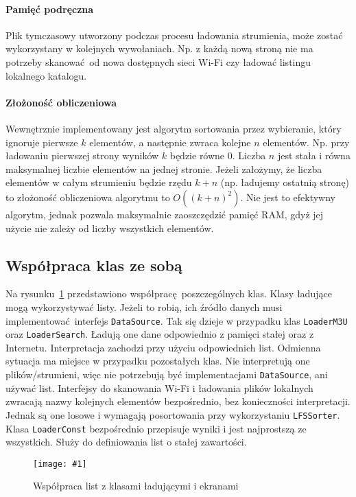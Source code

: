 \documentclass[polish]{aghengthesis}
\newcommand{\imgint}[4]{
	\begin{figure}[{#4}]
		\centering
		\texttt{[image: \#1]}
		\caption{#2}
		\label{#1}
	\end{figure}
}
\newcommand{\imgh}[3]{\imgint{#1}{#2}{#3}{H}}
\begin{document}
			\paragraph{Pamięć podręczna}
			Plik tymczasowy utworzony podczas procesu ładowania strumienia, może zostać wykorzystany w kolejnych wywołaniach. Np. z każdą nową stroną nie ma potrzeby skanować od nowa dostępnych sieci Wi-Fi czy ładować listingu lokalnego katalogu.
						
			\paragraph{Złożoność obliczeniowa}
			Wewnętrznie implementowany jest algorytm sortowania przez wybieranie, który ignoruje pierwsze $k$ elementów, a następnie zwraca kolejne $n$ elementów. Np. przy ładowaniu pierwszej strony wyników $k$ będzie równe 0. Liczba $n$ jest stała i równa maksymalnej liczbie elementów na jednej stronie. Jeżeli założymy, że liczba elementów w całym strumieniu będzie rzędu $k+n$ (np. ładujemy ostatnią stronę) to złożoność obliczeniowa algorytmu to $O((k+n)^2)$. Nie jest to efektywny algorytm, jednak pozwala maksymalnie zaoszczędzić pamięć RAM, gdyż jej użycie nie zależy od liczby wszystkich elementów.
			

		\subsection{Współpraca klas ze sobą}
			Na rysunku~\ref{3/PicoRadio-loaders} przedstawiono współpracę poszczególnych klas. Klasy ładujące mogą wykorzystywać listy. Jeżeli to robią, ich źródło danych musi implementować interfejs \lstinline|DataSource|. Tak się dzieje w przypadku klas \lstinline|LoaderM3U| oraz \lstinline|LoaderSearch|. Ładują one dane odpowiednio z pamięci stałej oraz z Internetu. Interpretacja zachodzi przy użyciu odpowiednich list. Odmienna sytuacja ma miejsce w przypadku pozostałych klas. Nie interpretują one plików/strumieni, więc nie potrzebują być implementacjami \lstinline|DataSource|, ani używać list. Interfejsy do skanowania Wi-Fi i ładowania plików lokalnych zwracają nazwy kolejnych elementów bezpośrednio, bez konieczności interpretacji. Jednak są one losowe i wymagają posortowania przy wykorzystaniu \lstinline|LFSSorter|. Klasa \lstinline|LoaderConst| bezpośrednio przepisuje wyniki i jest najprostszą ze wszystkich. Służy do definiowania list o stałej zawartości.
			
			\imgh{3/PicoRadio-loaders}{Współpraca list z klasami ładującymi i ekranami}{0.95}
			
\end{document}
